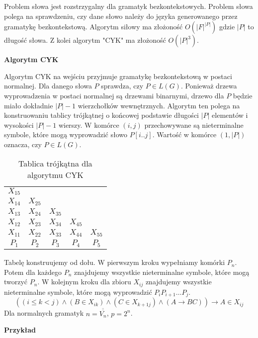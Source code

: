 \documentclass{../notatki}
\begin{document}
Problem słowa jest rozstrzygalny dla gramatyk bezkontekstowych.
Problem słowa polega na sprawdzeniu, czy dane słowo należy do języka
generowanego przez gramatykę bezkontekstową.
Algorytm siłowy ma złożoność $O(|F|^{|P|})$ gdzie $|P|$ to
długość słowa. Z kolei algorytm "CYK" ma złożoność $O(|P|^3)$.

\noindent \textbf{Algorytm CYK}

Algorytm CYK na wejściu przyjmuje gramatykę bezkontekstową w postaci
normalnej. Dla danego słowa $P$ sprawdza, czy $P \in L(G)$. Ponieważ drzewa
wyprowadzenia w postaci normalnej są drzewami binarnymi, drzewo dla $P$ będzie
miało dokładnie $|P| - 1$ wierzchołków wewnętrznych. Algorytm ten polega na
konstruowaniu tablicy trójkątnej o końcowej podstawie długości $|P|$ elementów
i wysokości $|P| - 1$ wierszy. W komórce $(i, j)$ przechowywane są nieterminalne
symbole, które mogą wyprowadzić słowo $P[i..j]$. Wartość w komórce $(1, |P|)$
oznacza, czy $P \in L(G)$.

\begin{table*}[h]
  \centering
  \begin{tabular}{|ccccc}
    $X_{15}$ & & & & \\
    $X_{14}$ & $X_{25}$ & & & \\
    $X_{13}$ & $X_{24}$ & $X_{35}$ & & \\
    $X_{12}$ & $X_{23}$ & $X_{34}$ & $X_{45}$ & \\
    $X_{11}$ & $X_{22}$ & $X_{33}$ & $X_{44}$ & $X_{55}$ \\
    \hline
    $P_1$ & $P_2$ & $P_3$ & $P_4$ & $P_5$
  \end{tabular}
  \caption{Tablica trójkątna dla algorytmu CYK}
\end{table*}

Tabelę konstruujemy od dołu. W pierwszym kroku wypełniamy komórki $P_n$. Potem
dla każdego $P_n$ znajdujemy wszystkie nieterminalne symbole, które mogą
tworzyć $P_n$. W kolejnym kroku dla zbioru $X_{ij}$ znajdujemy wszystkie
nieterminalne symbole, które mogą wyprowadzić $P_iP_{i+1}\dots P_j$.
$$
((i \le k < j) \land (B \in X_{ik}) \land (C \in X_{k+1j}) \land (A
\rightarrow BC)) \rightarrow A \in X_{ij}
$$
Dla normalnych gramatyk $n = \overline{\overline{V_n}}$, $p=2^n$.

\noindent \textbf{Przykład}
\end{document}
